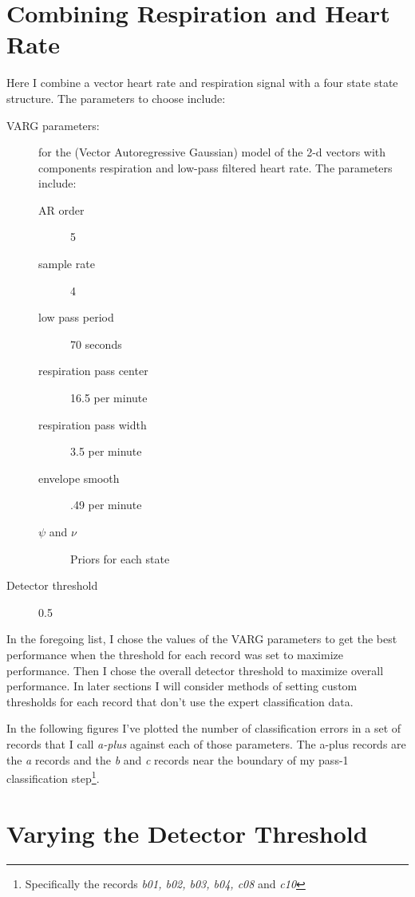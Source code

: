 \documentclass[12pt]{article}
\begin{document}
\section{Combining Respiration and Heart Rate}
\label{sec:combination}

Here I combine a vector heart rate and respiration signal with a four
state state structure.  The parameters to choose
include:
\begin{description}
\item[VARG parameters:] for the (Vector Autoregressive Gaussian) model
  of the 2-d vectors with components respiration and low-pass filtered
  heart rate.  The parameters include:
  \begin{description}
  \item[AR order] 5 %
  \item[sample rate] 4 %
  \item[low pass period] 70 seconds %
  \item[respiration pass center] 16.5 per minute %
  \item[respiration pass width] 3.5 per minute %
  \item[envelope smooth] .49 per minute %
  \item[$\psi$ and $\nu$] Priors for each state
  \end{description}
\item[Detector threshold] 0.5
\end{description}

In the foregoing list, I chose the values of the VARG parameters to
get the best performance when the threshold for each record was set to
maximize performance.  Then I chose the overall detector threshold to
maximize overall performance.  In later sections I will consider
methods of setting custom thresholds for each record that don't use
the expert classification data.

In the following figures I've plotted the number of classification
errors in a set of records that I call \emph{a-plus} against each of
those parameters.  The a-plus records are the \emph{a} records and the
\emph{b} and \emph{c} records near the boundary of my pass-1
classification step\footnote{Specifically the records \emph{b01, b02,
    b03, b04, c08} and \emph{c10}}.


\clearpage %
\section{Varying the Detector Threshold}
\label{sec:threshold}
\end{document}
